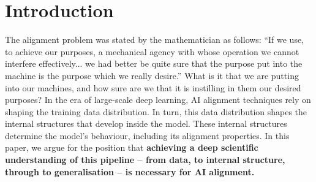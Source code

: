 
\section{Introduction}

The alignment problem was stated by the mathematician \citet{wiener1960some} as follows: ``If we use, to achieve our purposes, a mechanical agency with whose operation we cannot interfere effectively... we had better be quite sure that the purpose put into the machine is the purpose which we really desire.''
%
What is it that we are putting into our machines, and how sure are we that it is instilling in them our desired purposes? 
%
In the era of large-scale deep learning, AI alignment techniques rely on shaping the training data distribution. In turn, this data distribution shapes the internal structures that develop inside the model. These internal structures determine the model's behaviour, including its alignment properties.
%
In this paper, we argue for the position that \textbf{achieving a deep scientific understanding of this pipeline -- from data, to internal structure, through to generalisation -- is necessary for AI alignment.}

